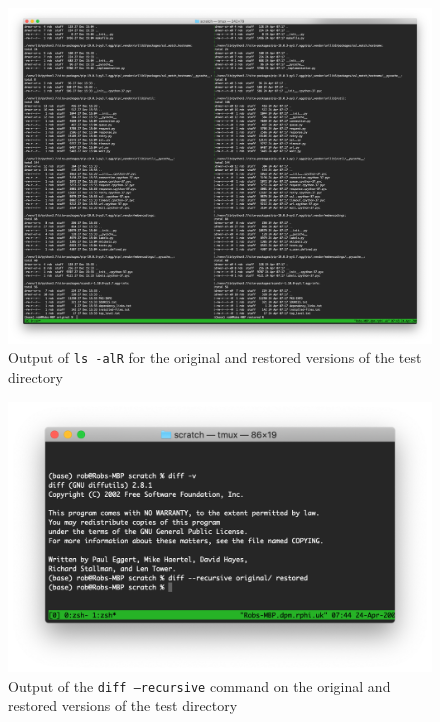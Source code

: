 \documentclass[bsc,frontabs,twoside,singlespacing,parskip,deptreport]{infthesis}     %
\begin{document}
\begin{figure}
	\includegraphics[width=1.1\linewidth]{img/screenshots/perms}
	\caption{Output of \texttt{ls -alR} for the original and restored versions of the test directory}
	\label{fig:perms}
\end{figure}

\begin{figure}
	\includegraphics[width=0.9\linewidth]{img/screenshots/diff}
	\caption{Output of the \texttt{diff --recursive} command on the original and restored versions of the test directory}
	\label{fig:diff}
\end{figure}



\end{document}
